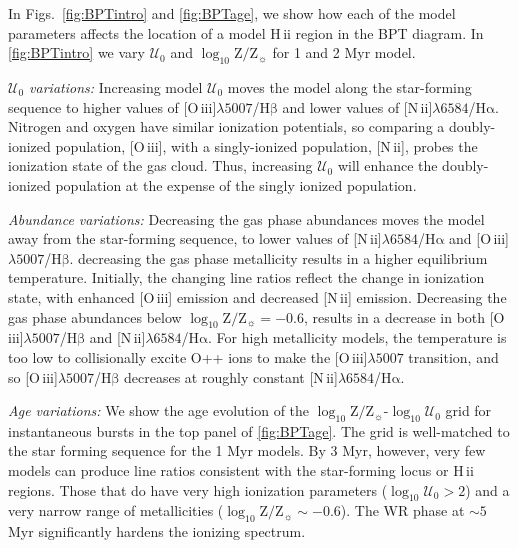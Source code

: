 \documentclass[linenumbers, tighten, trackchanges]{aastex61}%
\newcommand{\Fig}[1]{\autoref{fig:#1}}
\newcommand{\logten}{\ensuremath{\log_{10}}}
\newcommand{\nii}{[N\,{\sc ii}]\xspace}
\newcommand{\oiii}{[O\,{\sc iii}]\xspace}
\newcommand{\ha}{\ensuremath{\mathrm{H\alpha}}}
\newcommand{\hb}{\ensuremath{\mathrm{H\beta}}}
\newcommand{\hii}{H\,{\sc ii}\xspace}
\newcommand\lam[1]{\ensuremath{\lambda #1}}
\newcommand{\logz}{\ensuremath{\logten \mathrm{Z}/\mathrm{Z}_{\sun}}}
\newcommand{\logZeq}[1]{\ensuremath{\logten \mathrm{Z}/\mathrm{Z}_{\sun} = #1}}
\newcommand{\U}{\ensuremath{\mathcal{U}_{0}}}
\newcommand{\logU}{\ensuremath{\logten \mathcal{U}_0}}
\newcommand\niiha{\nii{}\lam{6584}/\ha{}}
\newcommand\oiiihb{\oiii{}\lam{5007}/\hb{}}
\begin{document}
In Figs.~\ref{fig:BPTintro} and \ref{fig:BPTage}, we show how each of the model parameters affects the location of a model \hii region in the BPT diagram. In \Fig{BPTintro} we vary \U{} and \logz{} for 1 and 2 Myr model.

{\it \U{} variations:} Increasing model \U{} moves the model along the star-forming sequence to higher values of \oiiihb{} and lower values of \niiha{}. Nitrogen and oxygen have similar ionization potentials, so comparing a doubly-ionized population, \oiii{}, with a singly-ionized population, \nii{}, probes the ionization state of the gas cloud. Thus, increasing \U{} will enhance the doubly-ionized population at the expense of the singly ionized population.

{\it Abundance variations:} Decreasing the gas phase abundances moves the model away from the star-forming sequence, to lower values of \niiha{} and \oiiihb{}.  decreasing the gas phase metallicity  results in a higher equilibrium temperature. Initially, the changing line ratios reflect the change in ionization state, with enhanced \oiii{} emission and decreased \nii{} emission.  Decreasing the gas phase abundances below \logZeq{-0.6},  results in a decrease in both \oiiihb{} and \niiha{}. For high metallicity models, the temperature is too low to collisionally excite O++ ions to make the \oiii{}\lam{5007} transition, and so \oiiihb{} decreases at roughly constant \niiha{}.

{\it Age variations:} We show the age evolution of the \logz{}-\logU{} grid for instantaneous bursts in the top panel of \Fig{BPTage}. The grid is well-matched to the star forming sequence for the 1 Myr models. By 3 Myr, however, very few models can produce line ratios consistent with the star-forming locus or \hii regions. Those that do have very high ionization parameters ($\logU > 2$) and a very narrow range of metallicities ($\logz \sim -0.6$). The WR phase at $\sim5$ Myr significantly hardens the ionizing spectrum.
\end{document}
